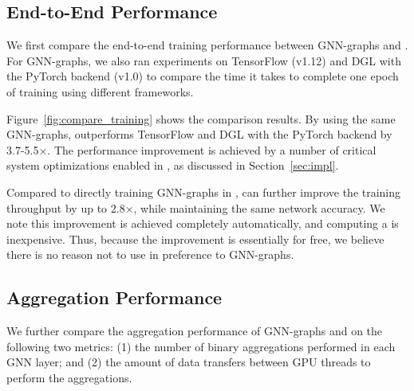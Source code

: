 \subsection{End-to-End Performance}
\label{subsec:eval_end}
We first compare the end-to-end training performance between GNN-graphs and \xgs.
For GNN-graphs, we also ran experiments on TensorFlow (v1.12) and DGL with the PyTorch backend (v1.0) to compare the time it takes to complete one epoch of training using different frameworks.

Figure~\ref{fig:compare_training} shows the comparison results.
By using the same GNN-graphs, \sys outperforms TensorFlow and DGL with the PyTorch backend by 3.7-5.5$\times$.
The performance improvement is achieved by a number of critical system optimizations enabled in \sys, as discussed in Section~\ref{sec:impl}.

Compared to directly training GNN-graphs in \sys, \xgs can further improve the training throughput by up to 2.8$\times$, while maintaining the same network accuracy.
We note this improvement is achieved completely automatically, and computing a \xg is inexpensive.
Thus, because the improvement is essentially for free, we believe there is no reason not to use \xgs in preference to GNN-graphs.


\subsection{Aggregation Performance}
\label{subsec:eval_agg}
We further compare the aggregation performance of GNN-graphs and \xgs on the following two metrics: (1) the number of binary aggregations performed in each GNN layer; and (2) the amount of data transfers between GPU threads to perform the aggregations.

